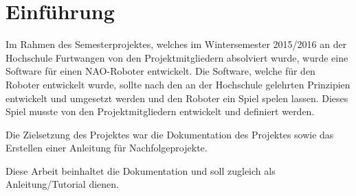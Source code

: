 \chapter{Einführung}

    Im Rahmen des Semesterprojektes, welches im Wintersemester 2015/2016 an der
    Hochschule Furtwangen von den Projektmitgliedern absolviert wurde, wurde
    eine Software für einen NAO-Roboter entwickelt.
    Die Software, welche für den Roboter entwickelt wurde, sollte nach den an
    der Hochschule gelehrten Prinzipien entwickelt und umgesetzt werden und den
    Roboter ein Spiel spelen lassen.
    Dieses Spiel musste von den Projektmitgliedern entwickelt und definiert
    werden.

    Die Zielsetzung des Projektes war die Dokumentation des Projektes sowie das
    Erstellen einer Anleitung für Nachfolgeprojekte.

    Diese Arbeit beinhaltet die Dokumentation und soll zugleich als
    Anleitung/Tutorial dienen.

